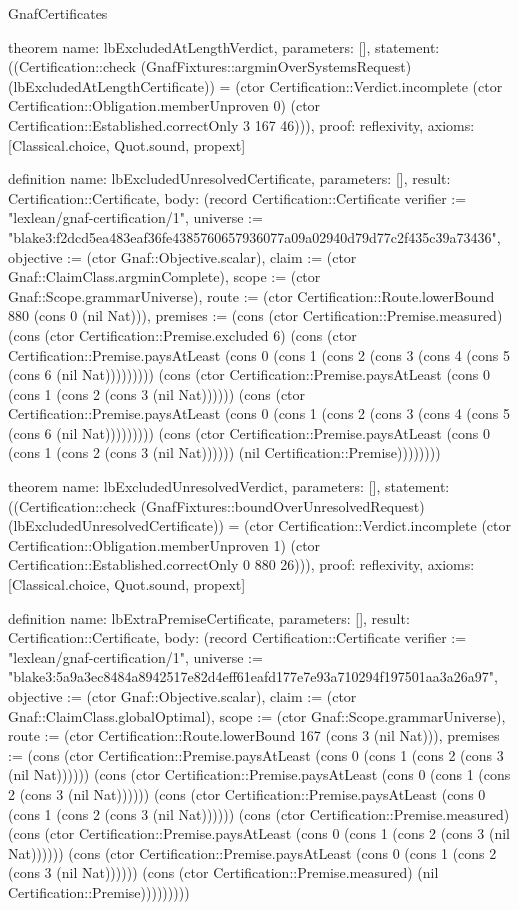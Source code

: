\begin{lexlean}{GnafCertificates}
\begin{semanticmodule}
theorem{
  name: lbExcludedAtLengthVerdict,
  parameters: [],
  statement: ((Certification::check (GnafFixtures::argminOverSystemsRequest) (lbExcludedAtLengthCertificate)) = (ctor Certification::Verdict.incomplete (ctor Certification::Obligation.memberUnproven 0) (ctor Certification::Established.correctOnly 3 167 46))),
  proof: reflexivity{},
  axioms: [Classical.choice, Quot.sound, propext]
}

definition{
  name: lbExcludedUnresolvedCertificate,
  parameters: [],
  result: Certification::Certificate,
  body: (record Certification::Certificate {verifier := "lexlean/gnaf-certification/1", universe := "blake3:f2dcd5ea483eaf36fe4385760657936077a09a02940d79d77c2f435c39a73436", objective := (ctor Gnaf::Objective.scalar), claim := (ctor Gnaf::ClaimClass.argminComplete), scope := (ctor Gnaf::Scope.grammarUniverse), route := (ctor Certification::Route.lowerBound 880 (cons 0 (nil Nat))), premises := (cons (ctor Certification::Premise.measured) (cons (ctor Certification::Premise.excluded 6) (cons (ctor Certification::Premise.paysAtLeast (cons 0 (cons 1 (cons 2 (cons 3 (cons 4 (cons 5 (cons 6 (nil Nat))))))))) (cons (ctor Certification::Premise.paysAtLeast (cons 0 (cons 1 (cons 2 (cons 3 (nil Nat)))))) (cons (ctor Certification::Premise.paysAtLeast (cons 0 (cons 1 (cons 2 (cons 3 (cons 4 (cons 5 (cons 6 (nil Nat))))))))) (cons (ctor Certification::Premise.paysAtLeast (cons 0 (cons 1 (cons 2 (cons 3 (nil Nat)))))) (nil Certification::Premise)))))))})
}

theorem{
  name: lbExcludedUnresolvedVerdict,
  parameters: [],
  statement: ((Certification::check (GnafFixtures::boundOverUnresolvedRequest) (lbExcludedUnresolvedCertificate)) = (ctor Certification::Verdict.incomplete (ctor Certification::Obligation.memberUnproven 1) (ctor Certification::Established.correctOnly 0 880 26))),
  proof: reflexivity{},
  axioms: [Classical.choice, Quot.sound, propext]
}

definition{
  name: lbExtraPremiseCertificate,
  parameters: [],
  result: Certification::Certificate,
  body: (record Certification::Certificate {verifier := "lexlean/gnaf-certification/1", universe := "blake3:5a9a3ec8484a8942517e82d4eff61eafd177e7e93a710294f197501aa3a26a97", objective := (ctor Gnaf::Objective.scalar), claim := (ctor Gnaf::ClaimClass.globalOptimal), scope := (ctor Gnaf::Scope.grammarUniverse), route := (ctor Certification::Route.lowerBound 167 (cons 3 (nil Nat))), premises := (cons (ctor Certification::Premise.paysAtLeast (cons 0 (cons 1 (cons 2 (cons 3 (nil Nat)))))) (cons (ctor Certification::Premise.paysAtLeast (cons 0 (cons 1 (cons 2 (cons 3 (nil Nat)))))) (cons (ctor Certification::Premise.paysAtLeast (cons 0 (cons 1 (cons 2 (cons 3 (nil Nat)))))) (cons (ctor Certification::Premise.measured) (cons (ctor Certification::Premise.paysAtLeast (cons 0 (cons 1 (cons 2 (cons 3 (nil Nat)))))) (cons (ctor Certification::Premise.paysAtLeast (cons 0 (cons 1 (cons 2 (cons 3 (nil Nat)))))) (cons (ctor Certification::Premise.measured) (nil Certification::Premise))))))))})
}


\end{semanticmodule}
\end{lexlean}
